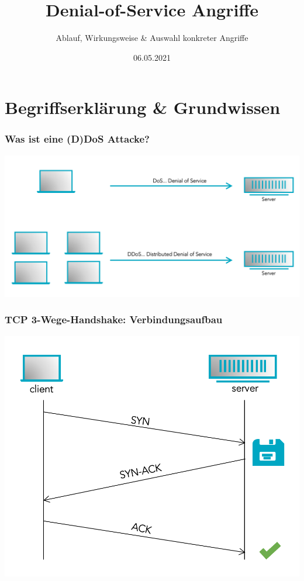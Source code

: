 \documentclass{beamer}
\title[Denial-of-Service Angriffe]{Denial-of-Service Angriffe}
\subtitle{Ablauf, Wirkungsweise \& Auswahl konkreter Angriffe}
\institute{TU Ilmenau}
\date{06.05.2021}
\begin{document}
\frame{\titlepage}

\section{Begriffserklärung \& Grundwissen}
\begin{frame}
	\frametitle{Was ist eine (D)DoS Attacke?}
	\includegraphics[width=0.9\linewidth]{img/1}
\end{frame}

\begin{frame}
	\frametitle{TCP 3-Wege-Handshake: Verbindungsaufbau}
	\begin{center}
		\includegraphics[width=0.9\linewidth]{img/2}
	\end{center}
\end{frame}
\end{document}
